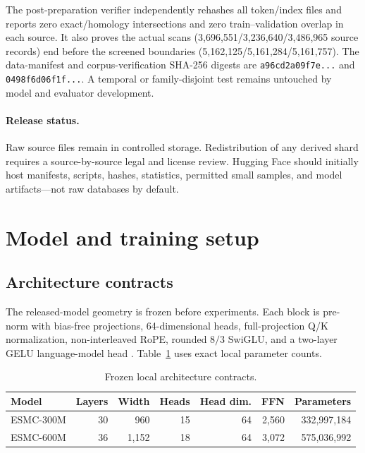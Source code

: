 \documentclass{article}
\newcommand{\code}[1]{\texttt{#1}}
\begin{document}
The post-preparation verifier independently rehashes all token/index files and
reports zero exact/homology intersections and zero train--validation overlap in
each source. It also proves the actual scans (3,696,551/3,236,640/3,486,965
source records) end before the screened boundaries
(5,162,125/5,161,284/5,161,757). The data-manifest and corpus-verification
SHA-256 digests are \code{a96cd2a09f7e...} and \code{0498f6d06f1f...}.
A temporal or family-disjoint test remains untouched by model and evaluator
development.

\paragraph{Release status.}
Raw source files remain in controlled storage. Redistribution of any derived
shard requires a source-by-source legal and license review. Hugging Face should
initially host manifests, scripts, hashes, statistics, permitted small samples,
and model artifacts---not raw databases by default.

\section{Model and training setup}
\label{app:training}

\subsection{Architecture contracts}

The released-model geometry is frozen before experiments. Each block is
pre-norm with bias-free projections, 64-dimensional heads, full-projection Q/K
normalization, non-interleaved RoPE, rounded $8/3$ SwiGLU, and a two-layer GELU
language-model head \citep{candido2026language}. Table~\ref{tab:architecture}
uses exact local parameter counts.

\begin{table}[H]
  \centering
  \small
  \begin{tabular}{@{}lrrrrrr@{}}
    \toprule
    Model & Layers & Width & Heads & Head dim. & FFN & Parameters \\
    \midrule
    ESMC-300M & 30 & 960 & 15 & 64 & 2,560 & 332,997,184 \\
    ESMC-600M & 36 & 1,152 & 18 & 64 & 3,072 & 575,036,992 \\
    \bottomrule
  \end{tabular}
  \caption{Frozen local architecture contracts.}
  \label{tab:architecture}
\end{table}
\end{document}
